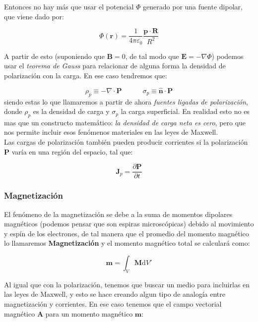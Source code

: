 \documentclass[12pt,a4paper]{article}
\newcommand{\parciales}[2]{\frac{\partial #1}{\partial #2}}
\newcommand{\D}{\mathrm{d}}
\newcommand{\tquad}{\quad \quad \quad}
\newcommand{\dive}{\nabla \cdot}
\newcommand{\Bn}{\mathbf{B}}
\newcommand{\En}{\mathbf{E}}
\newcommand{\Jn}{\mathbf{J}}
\newcommand{\rn}{\mathbf{r}}
\newcommand{\An}{\mathbf{A}}
\newcommand{\Pn}{\mathbf{P}}
\newcommand{\pn}{\mathbf{p}}
\newcommand{\mn}{\mathbf{m}}
\newcommand{\Mn}{\mathbf{M}}
\newcommand{\Rn}{\mathbf{R}}
\newcommand{\hnn}{\hat{\mathbf{n}}}
\numberwithin{equation}{section}
\numberwithin{figure}{section}
\begin{document}
Entonces no hay más que usar el potencial $\Phi$ generado por una fuente dipolar, que viene dado por:

\begin{equation}
\Phi (\rn) = \dfrac{1}{4 \pi \varepsilon_0} \dfrac{\pn \cdot \Rn}{R^2}
\end{equation}

A partir de esto (suponiendo que $\Bn=0$, de tal modo que $\En = - \nabla \Phi$) podemos usar el \textit{teorema de Gauss} para relacionar de alguna forma la densidad de polarización con la carga. En ese caso tendremos que:

\begin{equation}
\rho_p \equiv - \dive \Pn \tquad \sigma_p \equiv \hnn \cdot \Pn
\end{equation}
siendo estas lo que llamaremos a partir de ahora \textit{fuentes ligadas de polarización}, donde $\rho_p$ es la densidad de carga y $\sigma_p$ la carga superficial. En realidad esto no es mas que un constructo matemático: \textit{la densidad de carga neta es cero}, pero que nos permite incluir esos fenómenos materiales en las leyes de Maxwell. \\

Las cargas de polarización también pueden producir corrientes si la polarización $\Pn$ varía en una región del espacio, tal que:

\begin{equation}
\Jn_p = \parciales{\Pn}{t}
\end{equation}


\subsubsection{Magnetización}

El fenómeno de la magnetización se debe a la suma de momentos dipolares magnéticos (podemos pensar que son espiras microscópicas) debido al movimiento y espín de los electrones, de tal manera que el promedio del momento magnético lo llamaremos \textbf{Magnetización} y el momento magnético total se calculará como:

\begin{equation}
\mn = \int_V \Mn \D V' 
\end{equation}

Al igual que con la polarización, tenemos que buscar un medio para incluirlas en las leyes de Maxwell, y esto se hace creando algun tipo de analogía entre magnetización y corrientes. En ese caso tenemos que el campo vectorial magnético $\An$ para un momento magnético $\mn$:
\end{document}
